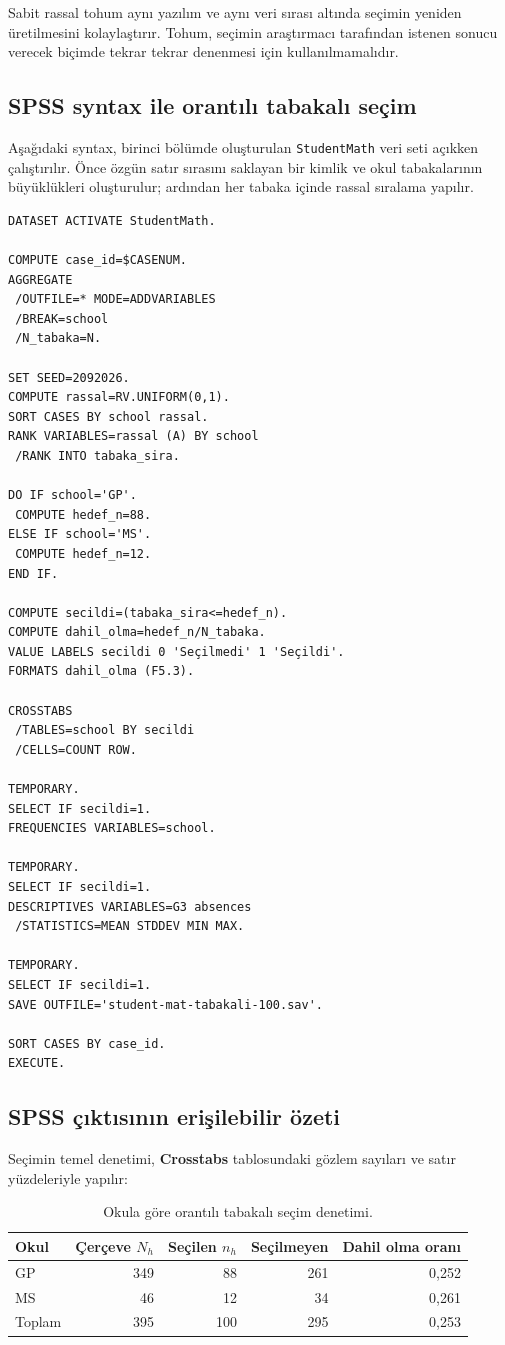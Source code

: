Sabit rassal tohum aynı yazılım ve aynı veri sırası altında seçimin yeniden
üretilmesini kolaylaştırır. Tohum, seçimin araştırmacı tarafından istenen
sonucu verecek biçimde tekrar tekrar denenmesi için kullanılmamalıdır.

\subsection{SPSS syntax ile orantılı tabakalı seçim}

Aşağıdaki syntax, birinci bölümde oluşturulan \texttt{StudentMath} veri seti
açıkken çalıştırılır. Önce özgün satır sırasını saklayan bir kimlik ve okul
tabakalarının büyüklükleri oluşturulur; ardından her tabaka içinde rassal
sıralama yapılır.

\begin{lstlisting}[language={}]
DATASET ACTIVATE StudentMath.

COMPUTE case_id=$CASENUM.
AGGREGATE
 /OUTFILE=* MODE=ADDVARIABLES
 /BREAK=school
 /N_tabaka=N.

SET SEED=2092026.
COMPUTE rassal=RV.UNIFORM(0,1).
SORT CASES BY school rassal.
RANK VARIABLES=rassal (A) BY school
 /RANK INTO tabaka_sira.

DO IF school='GP'.
 COMPUTE hedef_n=88.
ELSE IF school='MS'.
 COMPUTE hedef_n=12.
END IF.

COMPUTE secildi=(tabaka_sira<=hedef_n).
COMPUTE dahil_olma=hedef_n/N_tabaka.
VALUE LABELS secildi 0 'Seçilmedi' 1 'Seçildi'.
FORMATS dahil_olma (F5.3).

CROSSTABS
 /TABLES=school BY secildi
 /CELLS=COUNT ROW.

TEMPORARY.
SELECT IF secildi=1.
FREQUENCIES VARIABLES=school.

TEMPORARY.
SELECT IF secildi=1.
DESCRIPTIVES VARIABLES=G3 absences
 /STATISTICS=MEAN STDDEV MIN MAX.

TEMPORARY.
SELECT IF secildi=1.
SAVE OUTFILE='student-mat-tabakali-100.sav'.

SORT CASES BY case_id.
EXECUTE.
\end{lstlisting}

\subsection{SPSS çıktısının erişilebilir özeti}

Seçimin temel denetimi, \textbf{Crosstabs} tablosundaki gözlem sayıları ve satır
yüzdeleriyle yapılır:

\begin{table}[htbp]
\centering
\caption{Okula göre orantılı tabakalı seçim denetimi.}
\begin{tabular}{@{}lrrrr@{}}
\toprule
Okul & Çerçeve $N_h$ & Seçilen $n_h$ & Seçilmeyen & Dahil olma oranı \\
\midrule
GP & 349 & 88 & 261 & 0,252 \\
MS & 46  & 12 & 34  & 0,261 \\
\midrule
Toplam & 395 & 100 & 295 & 0,253 \\
\bottomrule
\end{tabular}
\end{table}


